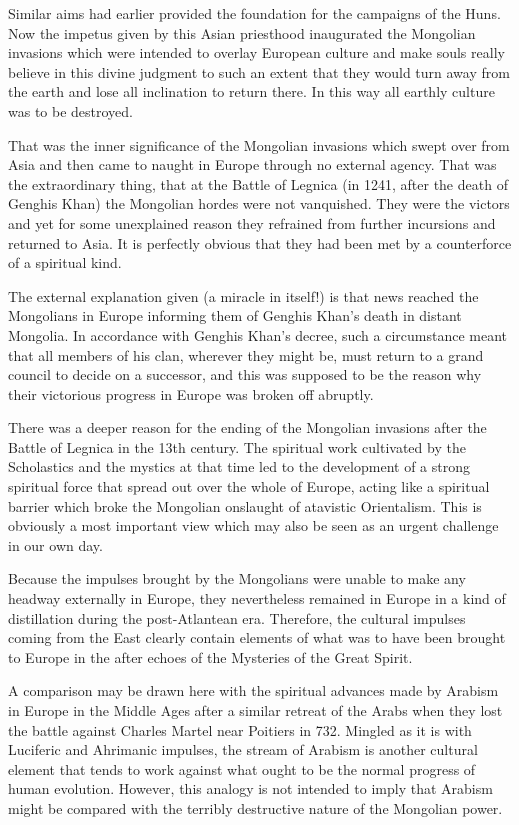 Similar aims had earlier provided the foundation for the campaigns of the Huns. Now the impetus given by this Asian priesthood inaugurated the Mongolian invasions which were intended to overlay European culture and make souls really believe in this divine judgment to such an extent that they would turn away from the earth and lose all inclination to return there. In this way all earthly culture was to be destroyed.

That was the inner significance of the Mongolian invasions which swept over from Asia and then came to naught in Europe through no external agency. That was the extraordinary thing, that at the Battle of Legnica (in 1241, after the death of Genghis Khan) the Mongolian hordes were not vanquished. They were the victors and yet for some unexplained reason they refrained from further incursions and returned to Asia. It is perfectly obvious that they had been met by a counterforce of a spiritual kind.

The external explanation given (a miracle in itself!) is that news reached the Mongolians in Europe informing them of Genghis Khan's death in distant Mongolia. In accordance with Genghis Khan's decree, such a circumstance meant that all members of his clan, wherever they might be, must return to a grand council to decide on a successor, and this was supposed to be the reason why their victorious progress in Europe was broken off abruptly.

There was a deeper reason for the ending of the Mongolian invasions after the Battle of Legnica in the 13th century. The spiritual work cultivated by the Scholastics and the mystics at that time led to the development of a strong spiritual force that spread out over the whole of Europe, acting like a spiritual barrier which broke the Mongolian onslaught of atavistic Orientalism. This is obviously a most important view which may also be seen as an urgent challenge in our own day.

Because the impulses brought by the Mongolians were unable to make any headway externally in Europe, they nevertheless remained in Europe in a kind of distillation during the post-Atlantean era. Therefore, the cultural impulses coming from the East clearly contain elements of what was to have been brought to Europe in the after echoes of the Mysteries of the Great Spirit.

A comparison may be drawn here with the spiritual advances made by Arabism in Europe in the Middle Ages after a similar retreat of the Arabs when they lost the battle against Charles Martel near Poitiers in 732. Mingled as it is with Luciferic and Ahrimanic impulses, the stream of Arabism is another cultural element that tends to work against what ought to be the normal progress of human evolution. However, this analogy is not intended to imply that Arabism might be compared with the terribly destructive nature of the Mongolian power.

